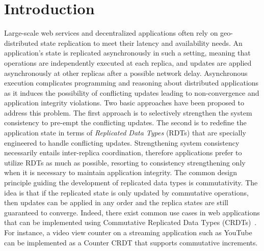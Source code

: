 \section{Introduction}
\label{sec:introduction}

Large-scale web services and decentralized applications often rely on
geo-distributed state replication to meet their latency and availability
needs. An application's state is replicated asynchronously in such a
setting, meaning that operations are independently executed at each
replica, and updates are applied asynchronously at other replicas after a
possible network delay. Asynchronous execution complicates programming and
reasoning about distributed applications as it induces the possibility of
conflicting updates leading to non-convergence and application integrity
violations. Two basic approaches have been proposed to address this
problem. The first approach is to selectively strengthen the system
consistency to pre-empt the conflicting updates. The second is to redefine
the application state in terms of \emph{Replicated Data Types} (RDTs) that
are specially engineered to handle conflicting updates. Strengthening
system consistency necessarily entails inter-replica coordination,
therefore applications prefer to utilize RDTs as much as possible,
resorting to consistency strengthening only when it is necessary to maintain
application integrity. The common design principle guiding the development
of replicated data types is commutativity. The idea is that if the
replicated state is only updated by commutative operations, then updates
can be applied in any order and the replica states are still guaranteed to
converge. Indeed, there exist common use cases in web applications that can
be implemented using Commutative Replicated Data Types
(CRDTs)~\cite{crdts}. For instance, a video view counter on a streaming
application such as YouTube can be implemented as a Counter CRDT that
supports commutative increments.

